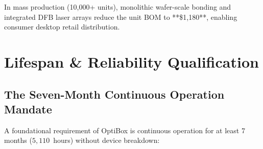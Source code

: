 \documentclass[11pt,a4paper]{report}
\begin{document}
In mass production (10,000+ units), monolithic wafer-scale bonding and integrated DFB laser arrays reduce the unit BOM to **\$1,180**, enabling consumer desktop retail distribution.

\chapter{Lifespan \& Reliability Qualification}

\section{The Seven-Month Continuous Operation Mandate}
A foundational requirement of OptiBox is continuous operation for at least 7 months ($5,110$~hours) without device breakdown:
\end{document}
